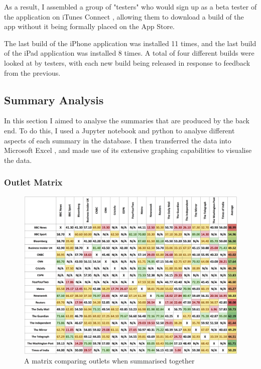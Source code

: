 \documentclass[12pt]{article}
\begin{document}
As a result, I assembled a group of "testers" who would sign up as a beta tester of the application on iTunes Connect \cite{itunesconnect}, allowing them to download a build of the app without it being formally placed on the App Store.

The last build of the iPhone application was installed 11 times, and the last build of the iPad application was installed 8 times. A total of four different builds were looked at by testers, with each new build being released in response to feedback from the previous.   

\subsection{Summary Analysis}

In this section I aimed to analyse the summaries that are produced by the back end. To do this, I used a Jupyter \cite{jupyter} notebook and python to analyse different aspects of each summary in the database. I then transferred the data into Microsoft Excel \cite{excel}, and made use of its extensive graphing capabilities to visualise the data.

\subsubsection{Outlet Matrix}

\begin{figure}
    \centering
    \includegraphics[width=\textwidth]{matrix.png}
    \caption{A matrix comparing outlets when summarised together}
    \label{fig:matrix}
\end{figure}
\end{document}

